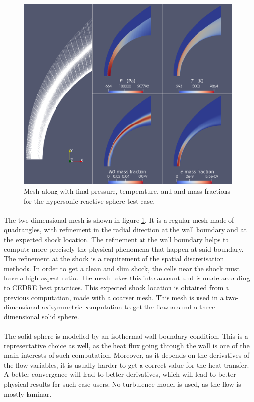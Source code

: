         \begin{figure}
          \centering
          \includegraphics[width=\textwidth]{figures/sphere_fields.png}
          \caption{Mesh along with final pressure, temperature, and  and  mass fractions for the hypersonic reactive sphere test case.}
          \label{fig:sphere_fields}
        \end{figure}

        \paragraph{}
        The two-dimensional mesh is shown in figure \ref{fig:sphere_fields}.
        It is a regular mesh made of quadrangles, with refinement in the radial direction at the wall boundary and at the expected shock location.
        The refinement at the wall boundary helps to compute more precisely the physical phenomena that happen at said boundary.
        The refinement at the shock is a requirement of the spatial discretisation methods.
        In order to get a clean and slim shock, the cells near the shock must have a high aspect ratio.
        The mesh takes this into account and is made according to CEDRE best practices.
        This expected shock location is obtained from a previous computation, made with a coarser mesh.
        This mesh is used in a two-dimensional axisymmetric computation to get the flow around a three-dimensional solid sphere.

        \paragraph{}
        The solid sphere is modelled by an isothermal wall boundary condition.
        This is a representative choice as well, as the heat flux going through the wall is one of the main interests of such computation.
        Moreover, as it depends on the derivatives of the flow variables, it is usually harder to get a correct value for the heat transfer.
        A better convergence will lead to better derivatives, which will lead to better physical results for such case users.
        No turbulence model is used, as the flow is mostly laminar.

